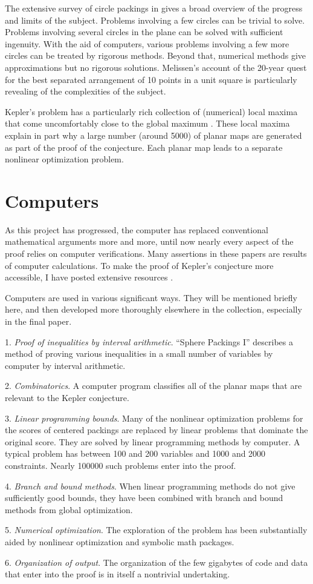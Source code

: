 The extensive survey of circle packings
in \cite{Mel97} gives a broad overview of the progress and limits
of the subject.
Problems involving a few circles can be
trivial to solve.
Problems involving several circles in the plane can be solved with
sufficient ingenuity.
With the aid of computers, various  problems involving
a few more circles can be
treated by rigorous methods.
Beyond that, numerical methods
give approximations but no rigorous solutions.
Melissen's account of
the 20-year quest for the best separated arrangement of 10
points in a unit square is particularly revealing of the complexities
of the subject.

Kepler's problem has a particularly rich collection of (numerical)
local maxima that come uncomfortably close to the global maximum
\cite{spp}. These local maxima explain in part why a large number
(around 5000) of planar maps are generated as part of the proof of
the conjecture.  Each planar map leads to a separate nonlinear
optimization problem.



\section{Computers}

As this project has progressed, the computer has replaced conventional
mathematical arguments more and more, until now
 nearly every aspect of the proof relies on
computer verifications.  Many assertions in these papers
 are results of computer calculations.
To make the proof of Kepler's conjecture more accessible, I have
posted extensive resources \cite{arXiv}.

Computers are used in various significant ways.  They will be
mentioned briefly here, and then developed more thoroughly elsewhere
in the collection, especially in the final paper.

1. {\it  Proof of inequalities by interval arithmetic}.  ``Sphere Packings
I'' describes a method of proving various inequalities in a small number
of variables by computer by interval arithmetic.

2.  {\it Combinatorics}.  A computer program classifies all of the planar maps
that are relevant to the Kepler conjecture.

3. {\it  Linear programming bounds}.  Many of the nonlinear optimization
    problems for the scores of centered packings are replaced by linear
    problems that dominate the original score.  They are solved
    by linear programming methods by computer.  A typical problem has
    between 100 and 200 variables and 1000 and 2000 constraints.  Nearly
    100000
    such problems enter into the proof.

4. {\it Branch and bound methods}.  When linear programming methods do not
    give sufficiently good bounds, they have been combined with branch
    and bound methods from global optimization.

5.  {\it Numerical optimization}.  The exploration of the problem
    has been substantially
    aided by nonlinear optimization and symbolic math packages.

6. {\it Organization of output}.
    The organization of the few gigabytes of code and data that
    enter into the proof is in itself a nontrivial undertaking.
